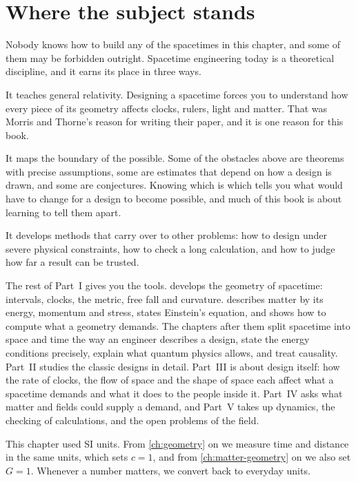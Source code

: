 \section{Where the subject stands}\label{sec:today}

Nobody knows how to build any of the spacetimes in this chapter, and some of
them may be forbidden outright. Spacetime engineering today is a theoretical
discipline, and it earns its place in three ways.

It teaches general relativity. Designing a spacetime forces you to understand
how every piece of its geometry affects clocks, rulers, light and matter. That
was Morris and Thorne's reason for writing their paper, and it is one reason
for this book.

It maps the boundary of the possible. Some of the obstacles above are theorems
with precise assumptions, some are estimates that depend on how a design is
drawn, and some are conjectures. Knowing which is which tells you what would
have to change for a design to become possible, and much of this book is
about learning to tell them apart.

It develops methods that carry over to other problems: how to design under
severe physical constraints, how to check a long calculation, and how to judge
how far a result can be trusted.

The rest of Part~I gives you the tools.  develops the
geometry of spacetime: intervals, clocks, the metric, free fall and
curvature.  describes matter by its energy, momentum
and stress, states Einstein's equation, and shows how to compute what a
geometry demands. The chapters after them split spacetime into space and time
the way an engineer describes a design, state the energy conditions
precisely, explain what quantum physics allows, and treat causality. Part~II
studies the classic designs in detail. Part~III is about design itself: how
the rate of clocks, the flow of space and the shape of space each affect what
a spacetime demands and what it does to the people inside it. Part~IV asks
what matter and fields could supply a demand, and Part~V takes up dynamics,
the checking of calculations, and the open problems of the field.

This chapter used SI units. From \cref{ch:geometry} on we measure time and
distance in the same units, which sets $c = 1$, and from
\cref{ch:matter-geometry} on we also set $G = 1$. Whenever a number matters,
we convert back to everyday units.

